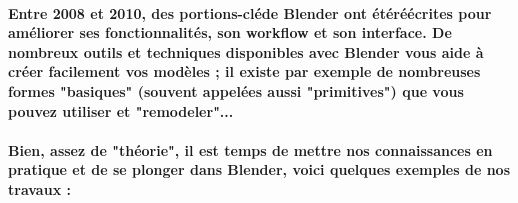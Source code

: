 \paragraph*{Entre 2008 et 2010, des portions-cl\'ede Blender ont \'et\'er\'e\'ecrites pour am\'eliorer ses fonctionnalit\'es, son workflow et son interface.
De nombreux outils et techniques disponibles avec Blender vous aide \`a cr\'eer facilement vos mod\`eles ; il existe par exemple de nombreuses formes "basiques" (souvent appel\'ees aussi "primitives") que vous pouvez utiliser et "remodeler"...}
\paragraph*{Bien, assez de "th\'eorie", il est temps de mettre nos connaissances en pratique et de se plonger dans Blender, voici quelques exemples de nos travaux :}